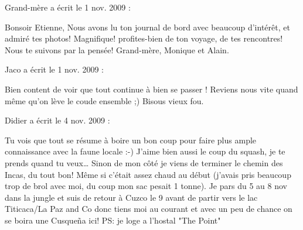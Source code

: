 \medskip
Grand-mère a écrit le 1 nov. 2009 :
\begin{displayquote}
Bonsoir Etienne,
Nous avons lu ton journal de bord avec beaucoup d'intérêt, et admiré tes photos! Magnifique! profites-bien de ton voyage, de tes rencontres! Nous te suivons par la pensée!
Grand-mère, Monique et Alain.
\end{displayquote}

\medskip
Jaco a écrit le 1 nov. 2009 :
\begin{displayquote}
Bien content de voir que tout continue à bien se passer !
Reviens nous vite quand même qu'on lève le coude ensemble ;)
Bisous vieux fou.
\end{displayquote}

\medskip
Didier a écrit le 4 nov. 2009 :
\begin{displayquote}
Tu vois que tout se résume à boire un bon coup pour faire plus ample connaissance avec la faune locale :-)
J'aime bien aussi le coup du squash, je te prends quand tu veux\dots
Sinon de mon côté je viens de terminer le chemin des Incas, du tout bon! Même si c'était assez chaud au début (j'avais pris beaucoup trop de brol avec moi, du coup mon sac pesait 1 tonne).
Je pars du 5 au 8 nov dans la jungle et suis de retour à Cuzco le 9 avant de partir vers le lac Titicaca/La Paz and Co donc tiens moi au courant et avec un peu de chance on se boira une Cusqueña ici!
PS: je loge a l'hostal "The Point"
\end{displayquote}

\vfill
